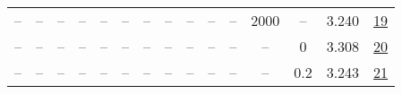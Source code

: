 \begin{table}[H]
\begin{tabular}{ccccccccccccccc}
-- & -- & -- & -- & -- & -- & -- & -- & -- & -- & -- & 2000 & -- & 3.240 & \href{https://wandb.ai/stanford-mercury/optimizer-scaling/runs/sweep-130m-21B-soapeaabbfclr0.008-wd0.1-minlr0-warmup2000-b10.95-1ffb1d}{19} \\
-- & -- & -- & -- & -- & -- & -- & -- & -- & -- & -- & -- & 0 & 3.308 & \href{https://wandb.ai/stanford-mercury/optimizer-scaling/runs/sweep-130m-21B-soape91df9clr0.008-wd0-minlr0-warmup1000-b10.95-b-345995}{20} \\
-- & -- & -- & -- & -- & -- & -- & -- & -- & -- & -- & -- & 0.2 & 3.243 & \href{https://wandb.ai/stanford-mercury/optimizer-scaling/runs/sweep-130m-21B-soapeb32093lr0.008-wd0.2-minlr0-warmup1000-b10.95-155463}{21} \\
\bottomrule
\end{tabular}
\end{table}


